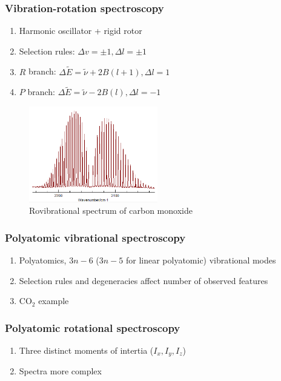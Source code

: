 \documentclass[11pt]{article}
\begin{document}
\subsubsection{Vibration-rotation spectroscopy}
\label{sec:org5968ca7}
\begin{enumerate}
\item Harmonic oscillator + rigid rotor
\item Selection rules: \(\Delta v = \pm 1, \Delta l=\pm 1\)
\item \(R\) branch: \(\Delta \tilde E  = \tilde \nu + 2B(l+1), \Delta l = 1\)
\item \(P\) branch: \(\Delta \tilde E = \tilde \nu - 2B(l), \Delta l = -1\)
\end{enumerate}
\begin{figure}[htbp]
\centering
\includegraphics[width=0.5\textwidth]{./Images/CO-rovib.png}
\caption{Rovibrational spectrum of carbon monoxide}
\end{figure}
\subsubsection{Polyatomic vibrational spectroscopy}
\label{sec:org85c93c5}
\begin{enumerate}
\item Polyatomics, \(3n-6\) (\(3n-5\) for linear polyatomic) vibrational modes
\item Selection rules and degeneracies affect number of observed features
\item CO\(_2\) example
\end{enumerate}
\subsubsection{Polyatomic rotational spectroscopy}
\label{sec:orgdfe0572}
\begin{enumerate}
\item Three distinct moments of intertia (\(I_x, I_y, I_z\))
\item Spectra more complex
\end{enumerate}
\end{document}
